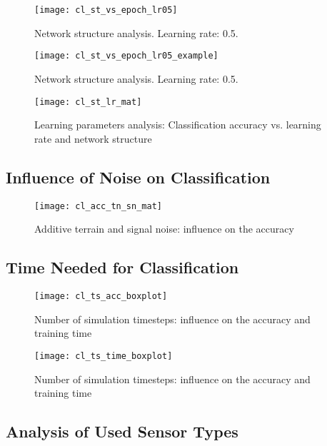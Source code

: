 \begin{figure}[H]
  \centering
  \texttt{[image: cl\_st\_vs\_epoch\_lr05]}
  \caption{Network structure analysis. Learning rate: 0.5.}
  \label{fig:st_analysis}
\end{figure}

\begin{figure}[H]
  \centering
  \texttt{[image: cl\_st\_vs\_epoch\_lr05\_example]}
  \caption{Network structure analysis. Learning rate: 0.5.}
  \label{fig:st_analysis_example}
\end{figure}

\begin{figure}[H]
  \centering
  \texttt{[image: cl\_st\_lr\_mat]}
  \caption{Learning parameters analysis: Classification accuracy vs. learning rate and network structure}
  \label{fig:acc_st_lr_mat}
\end{figure}

\subsection{Influence of Noise on Classification} \label{ssec:final_configuration}

\begin{figure}[H]
  \centering
  \texttt{[image: cl\_acc\_tn\_sn\_mat]}
  \caption{Additive terrain and signal noise: influence on the accuracy}
  \label{fig:acc_tn_sn_mat}
\end{figure}

\subsection{Time Needed for Classification} \label{ssec:number_of_timesteps}

\begin{figure}[H]
  \centering
  \texttt{[image: cl\_ts\_acc\_boxplot]}
  \caption{Number of simulation timesteps: influence on the accuracy and training time}
  \label{fig:ts_acc_boxplot}
\end{figure}

\begin{figure}[H]
  \centering
  \texttt{[image: cl\_ts\_time\_boxplot]}
  \caption{Number of simulation timesteps: influence on the accuracy and training time}
  \label{fig:ts_time_boxplot}
\end{figure}

\subsection{Analysis of Used Sensor Types} \label{ssec:analysis_of_used_sensor_types}

